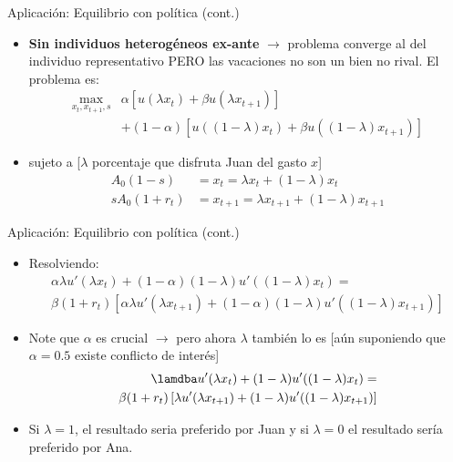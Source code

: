 \documentclass[14pt,aspectratio=169]{beamer}
\begin{document}
\begin{frame}{Aplicación: Equilibrio con política (cont.)}
  \begin{itemize}
  \item \textbf{Sin individuos heterogéneos ex-ante} $\longrightarrow$
    problema converge al del individuo representativo PERO las
    vacaciones no son un bien no rival. El problema es:
     \begin{align*}
\max_{x_{t},x_{t+1},s} & \alpha\left[u(\lambda x_{t})+\beta u(\lambda
      x_{t+1})\right] \\ & +(1-\alpha)\left[u((1-\lambda) x_{t})+\beta u((1-\lambda) x_{t+1})\right]
      \end{align*}
    \item sujeto a [$\lambda$ porcentaje que disfruta Juan del gasto $x$]
      \begin{align*}
                A_{0}(1-s)&=x_{t}=\lambda x_{t}+(1-\lambda)x_{t} \\
        sA_{0}(1+r_{t})&=x_{t+1}=\lambda x_{t+1}+(1-\lambda)x_{t+1} 
      \end{align*}
    \end{itemize}

\end{frame}


\begin{frame}{Aplicación: Equilibrio con política (cont.)}
  \begin{itemize}
  \item Resolviendo:
    \begin{align*}
\alpha \lambda u'(\lambda
      x_{t})+(1-\alpha)(1-\lambda)u'((1-\lambda)x_{t})= \\
      \beta(1+r_{t})\left[\alpha \lambda u'(\lambda
      x_{t+1})+(1-\alpha)(1-\lambda)u'((1-\lambda)x_{t+1})\right]
    \end{align*}
      \item Note que $\alpha$ es crucial $\longrightarrow$ pero ahora
        $\lambda$ también lo es [aún suponiendo que $\alpha=0.5$
        existe conflicto de interés]
        \begin{align*}
\lamdba u'(\lambda
          x_{t})+(1-\lambda)u'((1-\lambda)x_{t})= \\
          \beta(1+r_{t})\left[\lambda u'(\lambda
      x_{t+1})+(1-\lambda)u'((1-\lambda)x_{t+1})\right]
          \end{align*}
\item Si $\lambda=1$, el resultado seria preferido por Juan y si
  $\lambda=0$ el resultado sería preferido por Ana. 
        \end{itemize}

\end{frame}
\end{document}

